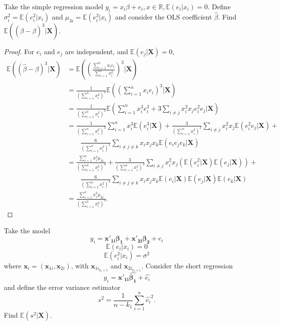\documentclass[12pt]{article}
\newenvironment{question}[2][Question]{\begin{trivlist}
\item[\hskip \labelsep {\bfseries #1}\hskip \labelsep {\bfseries #2.}]}{\end{trivlist}}
\begin{document}
\begin{question}{4.13}
Take the simple regression model $y_i = x_i\beta+e_i,x\in\mathbb{R},\mathbb{E}(e_i|x_i) = 0$. Define $\sigma_i^2 = \mathbb{E}(e_i^2|x_i)$ and $\mu_{3i}=\mathbb{E}(e_i^3|x_i)$ and consider the OLS coefficient $\hat{\beta}$. Find $\mathbb{E}((\hat{\beta}-\beta)^3|\bm{X})$.
\end{question}
\begin{proof}
For $e_i$ and $e_j$ are independent, and $\mathbb{E}(e_j|\bm{X})=0$,
\begin{align*}
\mathbb{E}((\hat{\beta}-\beta)^3|\bm{X})
&=\mathbb{E}((\frac{\sum_{i = 1}^{n}x_i e_i}{\sum_{i = 1}^{n}x_i^2})^3|\bm{X})\\
&=\frac{1}{(\sum_{i = 1}^{n}x_i^2)^3}\mathbb{E}((\sum_{i = 1}^{n}x_i e_i)^3|\bm{X})\\
&=\frac{1}{(\sum_{i = 1}^{n}x_i^2)^3}\mathbb{E}(\sum_{i = 1}^{n}x_i^3e_i^3+3\sum_{i\ne j}x_i^2x_je_i^2e_j|\bm{X})\\
&=\frac{1}{(\sum_{i = 1}^{n}x_i^2)^3}\sum_{i = 1}^{n}x_i^3\mathbb{E}(e_i^3|\bm{X})+
\frac{3}{(\sum_{i = 1}^{n}x_i^2)^3}\sum_{i \ne j}x_i^2x_j\mathbb{E}(e_i^2e_j|\bm{X})+\\
&\quad \quad \frac{6}{(\sum_{i = 1}^{n}x_i^2)^3}\sum_{i \ne j\ne k}x_ix_jx_k\mathbb{E}(e_ie_je_k|\bm{X})\\
&=\frac{\sum_{i = 1}^{n}x_i^3\mu_{3i}}{(\sum_{i = 1}^{n}x_i^2)^3}+
\frac{3}{(\sum_{i = 1}^{n}x_i^2)^3}\sum_{i \ne j}x_i^2x_j(\mathbb{E}(e_i^2|\bm{X})\mathbb{E}(e_j|\bm{X}))+\\
&\quad \quad \frac{6}{(\sum_{i = 1}^{n}x_i^2)^3}\sum_{i \ne j\ne k}x_ix_jx_k\mathbb{E}(e_i|\bm{X})\mathbb{E}(e_j|\bm{X})\mathbb{E}(e_k|\bm{X})\\
&=\frac{\sum_{i = 1}^{n}x_i^3\mu_{3i}}{(\sum_{i = 1}^{n}x_i^2)^3}.
\end{align*}
\end{proof}

\begin{question}{4.18}
Take the model $$y_i = \bm{x'_{1i}\beta_1}+\bm{x'_{2i}\beta_2}+e_i$$
$$\mathbb{E}(e_i|x_i) = 0$$
$$\mathbb{E}(e_i^2|x_i) = \sigma^2$$
where $\bm{x}_i = (\bm{x}_{1i},\bm{x}_{2i})$, with $\bm{x}_{1i}_{k_1\times1}$ and $\bm{x}_{2i}_{k_2\times1}$. Consider the short regression $$y_i = \bm{x'_{1i}\hat{\beta_1}}+\hat{e_i}$$
and define the error variance estimator
$$s^2 = \frac{1}{n-k_1}\sum_{i=1}^{n}\hat{e_i}^2.$$
Find $\mathbb{E}(s^2|\bm{X})$.
\end{question}
\end{document}
